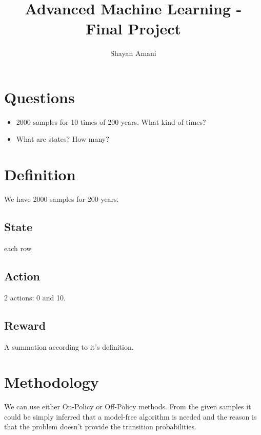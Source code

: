 \documentclass[a4paper,12pt]{article}
\title{Advanced Machine Learning - Final Project}
\author{Shayan Amani}
\begin{document}
\maketitle

\section{Questions}
\begin{itemize}
    \item 2000 samples for 10 times of 200 years. What kind of times?
    \item What are states? How many?
\end{itemize}

\section{Definition}
We have 2000 samples for 200 years.

\subsection{State}
each row 

\subsection{Action}
2 actions: 0 and 10.

\subsection{Reward}
A summation according to it's definition.


\section{Methodology}
We can use either On-Policy or Off-Policy methods. From the given samples it could be simply inferred that a model-free algorithm is needed and the reason is that the problem doesn't provide the transition probabilities.
\end{document}
